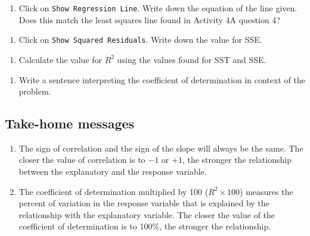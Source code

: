 \documentclass[
]{report}
\providecommand{\tightlist}{%
  \setlength{\itemsep}{0pt}\setlength{\parskip}{0pt}}
\begin{document}
\begin{enumerate}
\def\labelenumi{\arabic{enumi}.}
\setcounter{enumi}{9}
\tightlist
\item
  Click on \texttt{Show\ Regression\ Line}. Write down the equation of the line given. Does this match the least squares line found in Activity 4A question 4?
\end{enumerate}

\vspace{1in}

\begin{enumerate}
\def\labelenumi{\arabic{enumi}.}
\setcounter{enumi}{10}
\tightlist
\item
  Click on \texttt{Show\ Squared\ Residuals}. Write down the value for SSE.
\end{enumerate}

\vspace{0.5in}

\begin{enumerate}
\def\labelenumi{\arabic{enumi}.}
\setcounter{enumi}{11}
\tightlist
\item
  Calculate the value for \(R^2\) using the values found for SST and SSE.
\end{enumerate}

\vspace{1in}

\begin{enumerate}
\def\labelenumi{\arabic{enumi}.}
\setcounter{enumi}{12}
\tightlist
\item
  Write a sentence interpreting the coefficient of determination in context of the problem.
\end{enumerate}

\newpage

\hypertarget{take-home-messages-7}{%
\subsection{Take-home messages}\label{take-home-messages-7}}

\begin{enumerate}
\def\labelenumi{\arabic{enumi}.}
\item
  The sign of correlation and the sign of the slope will always be the same. The closer the value of correlation is to \(-1\) or \(+1\), the stronger the relationship between the explanatory and the response variable.
\item
  The coefficient of determination multiplied by 100 (\(R^2 \times 100\)) measures the percent of variation in the response variable that is explained by the relationship with the explanatory variable. The closer the value of the coefficient of determination is to 100\%, the stronger the relationship.
\end{enumerate}
\end{document}

